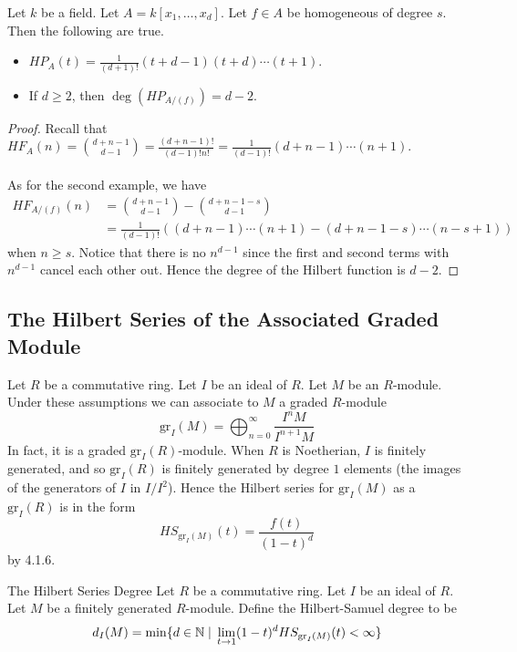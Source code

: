 \documentclass[a4paper]{article}
\begin{document}
\begin{eg}{}{} Let $k$ be a field. Let $A=k[x_1,\dots,x_d]$. Let $f\in A$ be homogeneous of degree $s$. Then the following are true. 
\begin{itemize}
\item $HP_A(t)=\frac{1}{(d+1)!}(t+d-1)(t+d)\cdots(t+1)$. 
\item If $d\geq 2$, then $\deg(HP_{A/(f)})=d-2$. 
\end{itemize} 
\begin{proof}
Recall that $HF_A(n)=\binom{d+n-1}{d-1}=\frac{(d+n-1)!}{(d-1)!n!}=\frac{1}{(d-1)!}(d+n-1)\cdots(n+1)$. \\~\\

As for the second example, we have 
\begin{align*}
HF_{A/(f)}(n)&=\binom{d+n-1}{d-1}-\binom{d+n-1-s}{d-1}\\
&=\frac{1}{(d-1)!}\left((d+n-1)\cdots(n+1)-(d+n-1-s)\cdots(n-s+1)\right)
\end{align*} when $n\geq s$. Notice that there is no $n^{d-1}$ since the first and second terms with $n^{d-1}$ cancel each other out. Hence the degree of the Hilbert function is $d-2$. 
\end{proof}
\end{eg}

\subsection{The Hilbert Series of the Associated Graded Module}
Let $R$ be a commutative ring. Let $I$ be an ideal of $R$. Let $M$ be an $R$-module. Under these assumptions we can associate to $M$ a graded $R$-module $$\text{gr}_I(M)=\bigoplus_{n=0}^\infty\frac{I^nM}{I^{n+1}M}$$ In fact, it is a graded $\text{gr}_I(R)$-module. When $R$ is Noetherian, $I$ is finitely generated, and so $\text{gr}_I(R)$ is finitely generated by degree $1$ elements (the images of the generators of $I$ in $I/I^2$). Hence the Hilbert series for $\text{gr}_I(M)$ as a $\text{gr}_I(R)$ is in the form $$HS_{\text{gr}_I(M)}(t)=\frac{f(t)}{(1-t)^d}$$ by 4.1.6. 

\begin{defn}{The Hilbert Series Degree}{} Let $R$ be a commutative ring. Let $I$ be an ideal of $R$. Let $M$ be a finitely generated $R$-module. Define the Hilbert-Samuel degree to be $$d_I(M)=\min\{d\in\mathbb{N}\;|\;\lim_{t\to 1}(1-t)^dHS_{\text{gr}_I(M)}(t)<\infty\}$$ 
\end{defn}
\end{document}

